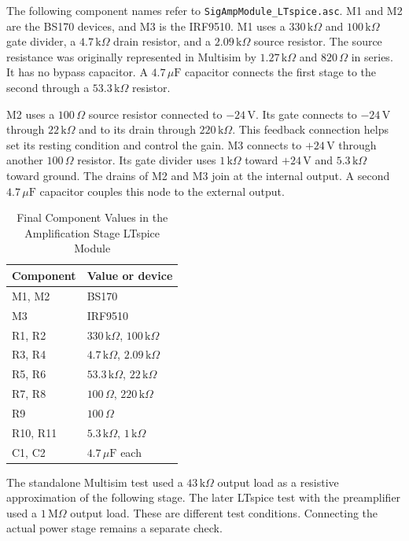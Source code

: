 \documentclass[conference]{IEEEtran}
\begin{document}
The following component names refer to \texttt{SigAmpModule\_LTspice.asc}. M1 and M2 are the BS170 devices, and M3 is the IRF9510. M1 uses a $330\,\mathrm{k}\Omega$ and $100\,\mathrm{k}\Omega$ gate divider, a $4.7\,\mathrm{k}\Omega$ drain resistor, and a $2.09\,\mathrm{k}\Omega$ source resistor. The source resistance was originally represented in Multisim by $1.27\,\mathrm{k}\Omega$ and $820\,\Omega$ in series. It has no bypass capacitor. A $4.7\,\mu\mathrm{F}$ capacitor connects the first stage to the second through a $53.3\,\mathrm{k}\Omega$ resistor.

M2 uses a $100\,\Omega$ source resistor connected to $-24\,\mathrm{V}$. Its gate connects to $-24\,\mathrm{V}$ through $22\,\mathrm{k}\Omega$ and to its drain through $220\,\mathrm{k}\Omega$. This feedback connection helps set its resting condition and control the gain. M3 connects to $+24\,\mathrm{V}$ through another $100\,\Omega$ resistor. Its gate divider uses $1\,\mathrm{k}\Omega$ toward $+24\,\mathrm{V}$ and $5.3\,\mathrm{k}\Omega$ toward ground. The drains of M2 and M3 join at the internal output. A second $4.7\,\mu\mathrm{F}$ capacitor couples this node to the external output.

\begin{table}[H]
\caption{Final Component Values in the Amplification Stage LTspice Module}
\label{tab:amplification_components}
\centering
\small
\begin{tabular}{ll}
\toprule
Component & Value or device \\
\midrule
M1, M2 & BS170 \\
M3 & IRF9510 \\
R1, R2 & $330\,\mathrm{k}\Omega$, $100\,\mathrm{k}\Omega$ \\
R3, R4 & $4.7\,\mathrm{k}\Omega$, $2.09\,\mathrm{k}\Omega$ \\
R5, R6 & $53.3\,\mathrm{k}\Omega$, $22\,\mathrm{k}\Omega$ \\
R7, R8 & $100\,\Omega$, $220\,\mathrm{k}\Omega$ \\
R9 & $100\,\Omega$ \\
R10, R11 & $5.3\,\mathrm{k}\Omega$, $1\,\mathrm{k}\Omega$ \\
C1, C2 & $4.7\,\mu\mathrm{F}$ each \\
\bottomrule
\end{tabular}
\end{table}

The standalone Multisim test used a $43\,\mathrm{k}\Omega$ output load as a resistive approximation of the following stage. The later LTspice test with the preamplifier used a $1\,\mathrm{M}\Omega$ output load. These are different test conditions. Connecting the actual power stage remains a separate check.
\end{document}
